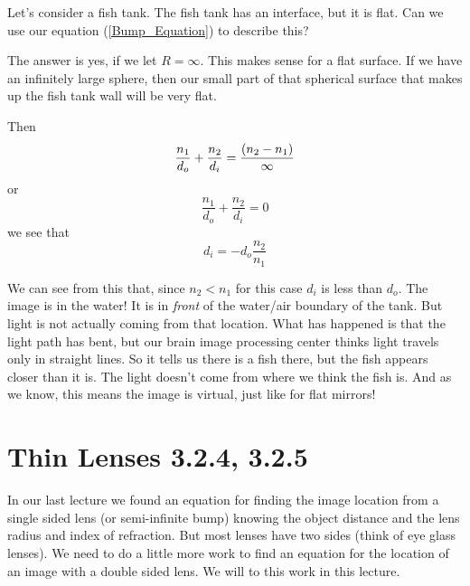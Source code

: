 \documentclass{article}
\begin{document}

Let's consider a fish tank. The fish tank has an interface, but it is flat.
Can we use our equation (\ref{Bump_Equation}) to describe this?

The answer is yes, if we let $R=\infty .$ This makes sense for a flat
surface. If we have an infinitely large sphere, then our small part of that
spherical surface that makes up the fish tank wall will be very flat.

Then%
\[
\frac{n_{1}}{d_{o}}+\frac{n_{2}}{d_{i}}=\frac{\left( n_{2}-n_{1}\right) }{%
\infty }
\]%
or%
\[
\frac{n_{1}}{d_{o}}+\frac{n_{2}}{d_{i}}=0
\]%
we see that 
\[
d_{i}=-d_{o}\frac{n_{2}}{n_{1}}
\]

We can see from this that, since $n_{2}<n_{1}$ for this case $d_{i}$ is less
than $d_{o}.$ The image is in the water! It is in \emph{front} of the
water/air boundary of the tank. But light is not actually coming from that
location. What has happened is that the light path has bent, but our brain
image processing center thinks light travels only in straight lines. So it
tells us there is a fish there, but the fish appears closer than it is. The
light doesn't come from where we think the fish is. And as we know, this
means the image is virtual, just like for flat mirrors!

\section{Thin Lenses 3.2.4, 3.2.5}

In our last lecture we found an equation for finding the image location from
a single sided lens (or semi-infinite bump) knowing the object distance and
the lens radius and index of refraction. But most lenses have two sides
(think of eye glass lenses). We need to do a little more work to find an
equation for the location of an image with a double sided lens. We will to
this work in this lecture.

\vspace{0.10in}%
\end{document}
